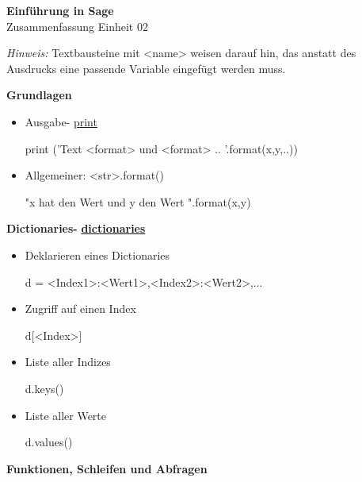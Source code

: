 \documentclass[a4paper,9pt,DIV15,twocolumn]{scrartcl}
\begin{document}
\begin{center}
    \textbf{\LARGE Einführung in Sage}\\
    {\large Zusammenfassung Einheit 02}
\end{center}
\textsl{Hinweis:} Textbausteine mit <name> weisen darauf hin, das anstatt des Ausdrucks eine passende Variable eingefügt werden muss.

\medskip
\textbf{Grundlagen}
\begin{itemize}
    \item Ausgabe- \href{http://docs.python.org/library/functions.html?highlight=print#print}{print} 
        \begin{sagein}
print ('Text {<format>} und {<format>} .. '.format(x,y,..))
        \end{sagein}
			\item Allgemeiner: <str>.format()
				\begin{sagein}
"x hat den Wert {} und y den Wert {}".format(x,y)
				\end{sagein}
\end{itemize}



\textbf{Dictionaries- } \href{http://docs.python.org/library/stdtypes.html?highlight=.update#mapping-types-dict}{\textbf{dictionaries}}

\begin{itemize}
 \item Deklarieren eines Dictionaries
\begin{sagein}
d = {<Index1>:<Wert1>,<Index2>:<Wert2>,...}
\end{sagein}
 \item Zugriff auf einen Index
\begin{sagein}
d[<Index>]
\end{sagein}
\item Liste aller Indizes
	\begin{sagein}
d.keys()
	\end{sagein}
\item Liste aller Werte
	\begin{sagein}
d.values()
	\end{sagein}
\end{itemize}

\textbf{Funktionen, Schleifen und Abfragen}
\end{document}
